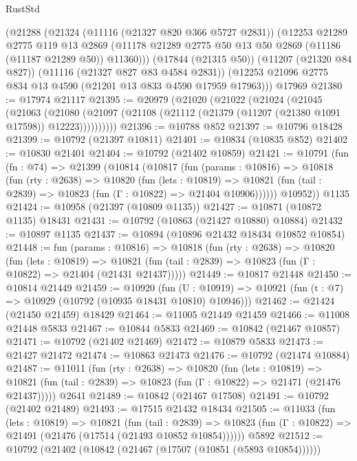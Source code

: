 \begin{lexlean}{RustStd}
\begin{coremodule}
    (@21288
      (@21324
        (@11116 (@21327 @820 @366 @5727 @2831))
        (@12253
          @21289
          @2775
          @119
          @13
          @2869
          (@11178 @21289 @2775 @50 @13 @50 @2869 (@11186 (@11187 @21289 @50)) @11360)))
      (@17844 (@21315 @50))
      (@11207 (@21320 @84 @827))
      (@11116 (@21327 @827 @83 @4584 @2831))
      (@12253 @21096 @2775 @834 @13 @4590 (@21201 @13 @833 @4590 @17959 @17963)))
    @17969
@21380 := @17974 @21117
@21395 := @20979
    (@21020
      (@21022
        (@21024
          (@21045
            (@21063
              (@21080
                (@21097 (@21108 (@21112 (@21379 (@11207 (@21380 @1091 @17598)) @12223))))))))))
@21396 := @10788 @852
@21397 := @10796 @18428
@21399 := @10792 (@21397 @10811)
@21401 := @10834 (@10835 @852)
@21402 := @10830 @21401
@21404 := @10792 (@21402 @10859)
@21421 := @10791
    (fun (fn : @74) =>
    @21399
      (@10814
        (@10817
          (fun (params : @10816) =>
          @10818
            (fun (rty : @2638) =>
            @10820
              (fun (lets : @10819) =>
              @10821 (fun (tail : @2839) => @10823 (fun (Γ : @10822) => @21404 @10906))))))
        @10952))
    @1135
@21424 := @10958 (@21397 (@10809 @1135))
@21427 := @10871 (@10872 @1135) @18431
@21431 := @10792 (@10863 (@21427 @10880) @10884)
@21432 := @10897 @1135
@21437 := @10894 (@10896 @21432 @18434 @10852 @10854)
@21448 := fun (params : @10816) =>
  @10818
    (fun (rty : @2638) =>
    @10820
      (fun (lets : @10819) =>
      @10821 (fun (tail : @2839) => @10823 (fun (Γ : @10822) => @21404 (@21431 @21437)))))
@21449 := @10817 @21448
@21450 := @10814 @21449
@21459 := @10920
    (fun (U : @10919) => @10921 (fun (t : @7) => @10929 (@10792 (@10935 @18431 @10810) @10946)))
@21462 := @21424 (@21450 @21459) @18429
@21464 := @11005 @21449 @21459
@21466 := @11008 @21448 @5833
@21467 := @10844 @5833
@21469 := @10842 (@21467 @10857)
@21471 := @10792 (@21402 @21469)
@21472 := @10879 @5833
@21473 := @21427 @21472
@21474 := @10863 @21473
@21476 := @10792 (@21474 @10884)
@21487 := @11011
    (fun (rty : @2638) =>
    @10820
      (fun (lets : @10819) =>
      @10821 (fun (tail : @2839) => @10823 (fun (Γ : @10822) => @21471 (@21476 @21437)))))
    @2641
@21489 := @10842 (@21467 @17508)
@21491 := @10792 (@21402 @21489)
@21493 := @17515 @21432 @18434
@21505 := @11033
    (fun (lets : @10819) =>
    @10821
      (fun (tail : @2839) =>
      @10823 (fun (Γ : @10822) => @21491 (@21476 (@17514 (@21493 @10852 @10854))))))
    @5892
@21512 := @10792 (@21402 (@10842 (@21467 (@17507 (@10851 (@5893 @10854))))))

\end{coremodule}
\end{lexlean}
